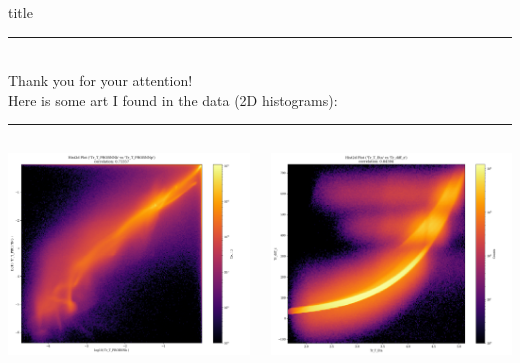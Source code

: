 \documentclass[aspectratio=1610, 10pt]{beamer}
\begin{document}
\begin{frame}[plain]
  \centering
  \begin{beamercolorbox}[center, wd=\textwidth]{title}
    \textcolor{tugreen}{\rule{\textwidth}{1pt}}\\[0.5\baselineskip]%
    Thank you for your attention!
    \\[0.5\baselineskip]%
    Here is some art I found in the data (2D histograms):\newline%
    \textcolor{tugreen}{\rule{\textwidth}{1pt}}%
  \end{beamercolorbox}%
  \begin{columns}
    \begin{column}{0.5\textwidth}
      \centering
      \includegraphics[width=1.1\textwidth]{images/art1.png}
    \end{column}
    \begin{column}{0.5\textwidth}
      \centering
      \includegraphics[width=1.1\textwidth]{images/art2.png}
    \end{column}
  \end{columns}
\end{frame}
\end{document}
